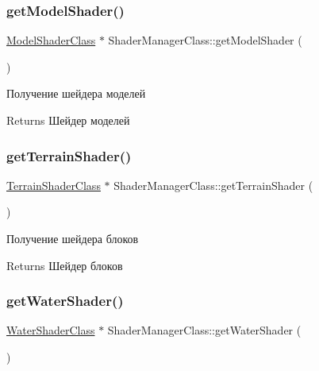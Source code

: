 \subsubsection{\texorpdfstring{get\+Model\+Shader()}{getModelShader()}}
{\footnotesize\ttfamily \hyperlink{class_model_shader_class}{Model\+Shader\+Class} $\ast$ Shader\+Manager\+Class\+::get\+Model\+Shader (\begin{DoxyParamCaption}{ }\end{DoxyParamCaption})}



Получение шейдера моделей 

\begin{DoxyReturn}{Returns}
Шейдер моделей 
\end{DoxyReturn}
\mbox{\label{class_shader_manager_class_a55c6138987f24dd93b3173b5a789bfb8}} 
\subsubsection{\texorpdfstring{get\+Terrain\+Shader()}{getTerrainShader()}}
{\footnotesize\ttfamily \hyperlink{class_terrain_shader_class}{Terrain\+Shader\+Class} $\ast$ Shader\+Manager\+Class\+::get\+Terrain\+Shader (\begin{DoxyParamCaption}{ }\end{DoxyParamCaption})}



Получение шейдера блоков 

\begin{DoxyReturn}{Returns}
Шейдер блоков 
\end{DoxyReturn}
\mbox{\label{class_shader_manager_class_a58ba38e8abececb2aeee26b66cb67f03}} 
\subsubsection{\texorpdfstring{get\+Water\+Shader()}{getWaterShader()}}
{\footnotesize\ttfamily \hyperlink{class_water_shader_class}{Water\+Shader\+Class} $\ast$ Shader\+Manager\+Class\+::get\+Water\+Shader (\begin{DoxyParamCaption}{ }\end{DoxyParamCaption})}



